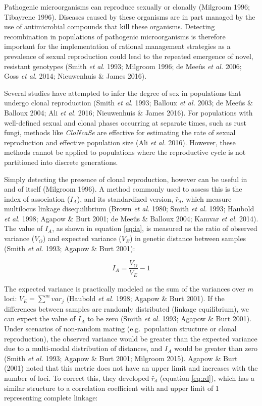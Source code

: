 \documentclass[]{article}
\theoremstyle{definition}
\theoremstyle{definition}
\theoremstyle{definition}
\theoremstyle{remark}
\begin{document}
Pathogenic microorganisms can reproduce sexually or clonally (Milgroom
1996; Tibayrenc 1996). Diseases caused by these organisms are in part
managed by the use of antimicrobial compounds that kill these organisms.
Detecting recombination in populations of pathogenic microorganisms is
therefore important for the implementation of rational management
strategies as a prevalence of sexual reproduction could lead to the
repeated emergence of novel, resistant genotypes (Smith \emph{et al.}
1993; Milgroom 1996; de Meeûs \emph{et al.} 2006; Goss \emph{et al.}
2014; Nieuwenhuis \& James 2016).

Several studies have attempted to infer the degree of sex in populations
that undergo clonal reproduction (Smith \emph{et al.} 1993; Balloux
\emph{et al.} 2003; de Meeûs \& Balloux 2004; Ali \emph{et al.} 2016;
Nieuwenhuis \& James 2016). For populations with well-defined sexual and
clonal phases occurring at separate times, such as rust fungi, methods
like \emph{CloNcaSe} are effective for estimating the rate of sexual
reproduction and effective population size (Ali \emph{et al.} 2016).
However, these methods cannot be applied to populations where the
reproductive cycle is not partitioned into discrete generations.

Simply detecting the presence of clonal reproduction, however can be
useful in and of itself (Milgroom 1996). A method commonly used to
assess this is the index of association (\(I_A\)), and its standardized
version, \(\bar{r}_d\), which measure multilocus linkage disequilibrium
(Brown \emph{et al.} 1980; Smith \emph{et al.} 1993; Haubold \emph{et
al.} 1998; Agapow \& Burt 2001; de Meeûs \& Balloux 2004; Kamvar
\emph{et al.} 2014). The value of \(I_A\), as shown in equation
\eqref{eq:ia}, is measured as the ratio of observed variance (\(V_O\)) and
expected variance (\(V_E\)) in genetic distance between samples (Smith
\emph{et al.} 1993; Agapow \& Burt 2001):

\begin{equation}
I_A = \frac{V_O}{V_E} - 1 \label{eq:ia}
\end{equation}

The expected variance is practically modeled as the sum of the variances
over \emph{m} loci: \(V_E = \sum^m{var_j}\) (Haubold \emph{et al.} 1998;
Agapow \& Burt 2001). If the differences between samples are randomly
distributed (linkage equilibrium), we can expect the value of \(I_A\) to
be zero (Smith \emph{et al.} 1993; Agapow \& Burt 2001). Under scenarios
of non-random mating (e.g.~population structure or clonal reproduction),
the observed variance would be greater than the expected variance due to
a multi-modal distribution of distances, and \(I_A\) would be greater
than zero (Smith \emph{et al.} 1993; Agapow \& Burt 2001; Milgroom
2015). Agapow \& Burt (2001) noted that this metric does not have an
upper limit and increases with the number of loci. To correct this, they
developed \(\bar{r}_d\) (equation \eqref{eq:rd}), which has a similar
structure to a correlation coefficient with and upper limit of 1
representing complete linkage:
\end{document}
